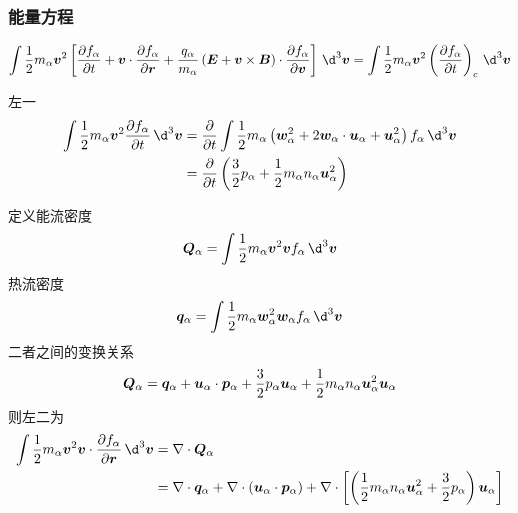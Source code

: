 \subsubsection{能量方程}

\begin{equation}
\int \frac{1}{2} m_\alpha \vector{v}^2 \left[
    \pDeriv{f_\alpha}{t} + \vector{v} \cdot \pDeriv{f_\alpha}{\vector{r}} + \frac{q_\alpha}{m_\alpha} \left( \vector{E} + \vector{v} \times \vector{B} \right) \cdot \pDeriv{f_\alpha}{\vector{v}}
\right] \, \d^3 \vector{v}
= \int \frac{1}{2} m_\alpha \vector{v}^2 \left( \pDeriv{f_\alpha}{t} \right)_c \, \d^3 \vector{v}
\end{equation}

左一
\begin{equation}\begin{aligned}
\int \frac{1}{2} m_\alpha \vector{v}^2 \pDeriv{f_\alpha}{t} \, \d^3 \vector{v}
&= \pDeriv{}{t} \int \frac{1}{2} m_\alpha \left(
    \vector{w}_\alpha^2 + 2 \vector{w}_\alpha \cdot \vector{u}_\alpha + \vector{u}_\alpha^2
\right) f_\alpha \, \d^3 \vector{v} \\
&= \pDeriv{}{t} \left(
    \frac{3}{2} p_\alpha + \frac{1}{2} m_\alpha n_\alpha \vector{u}_\alpha^2
\right)
\end{aligned}\end{equation}

定义能流密度
\begin{equation}
\vector{Q}_\alpha = \int \frac{1}{2} m_\alpha \vector{v}^2 \vector{v} f_\alpha \, \d^3 \vector{v}
\end{equation}
热流密度
\begin{equation}
\vector{q}_\alpha = \int \frac{1}{2} m_\alpha \vector{w}_\alpha^2 \vector{w}_\alpha f_\alpha \, \d^3 \vector{v}
\end{equation}
二者之间的变换关系
\begin{equation}
\bm{Q}_\alpha = \bm{q}_\alpha + \bm{u}_\alpha \cdot \bm{p}_\alpha
+ \frac{3}{2} p_\alpha \bm{u}_\alpha + \frac{1}{2} m_\alpha n_\alpha \bm{u}_\alpha^2 \bm{u}_\alpha
\end{equation}
则左二为
\begin{equation}\begin{aligned}
\int \frac{1}{2} m_\alpha \vector{v}^2 \vector{v} \cdot \pDeriv{f_\alpha}{\vector{r}} \, \d^3 \vector{v}
&= \dive{\vector{Q}_\alpha} \\
&= \dive{\vector{q}_\alpha} + \dive{(\vector{u}_\alpha \cdot \vector{p}_\alpha)}
+ \dive{\left[\left(\frac{1}{2} m_\alpha n_\alpha \vector{u}_\alpha^2 + \frac{3}{2} p_\alpha \right) \vector{u}_\alpha\right]}
\end{aligned}\end{equation}

